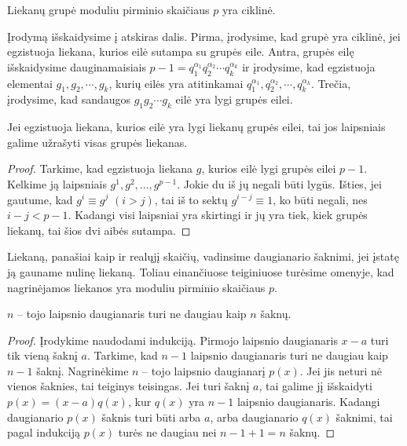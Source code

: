 \begin{thm} 
  Liekanų grupė moduliu pirminio skaičiaus $p$ yra ciklinė.
\end{thm}

Įrodymą išskaidysime į atskiras dalis. Pirma, įrodysime, kad grupė yra
ciklinė, jei egzistuoja liekana, kurios eilė sutampa su grupės eile. Antra,
grupės eilę išskaidysime dauginamaisiais $p-1 = q_1^{\alpha_1}
q_2^{\alpha_2} \cdots q_k^{\alpha_k}$ ir įrodysime, kad egzistuoja
elementai $g_1, g_2, \cdots, g_k$, kurių eilės yra atitinkamai
$q_1^{\alpha_1}, q_2^{\alpha_2}, \cdots, q_k^{\alpha_k}$. Trečia,
įrodysime, kad sandaugos $g_1g_2\cdots g_k$ eilė yra lygi grupės eilei. 

\begin{teig}
  Jei egzistuoja liekana, kurios eilė yra lygi liekanų grupės eilei, tai jos
  laipsniais galime užrašyti visas grupės liekanas.
\end{teig}

\begin{proof}
  Tarkime, kad egzistuoja liekana $g$, kurios eilė lygi grupės eilei
  $p-1$. Kelkime ją laipsniais $g^1, g^2, \dots, g^{p-1}$. Jokie du iš jų
  negali būti lygūs. Išties, jei gautume, kad $g^i \equiv g^j$ $(i>j)$, tai iš to
  sektų $g^{i-j}\equiv 1$, ko būti negali, nes $i-j<p-1$. Kadangi visi
  laipsniai yra skirtingi ir jų yra tiek, kiek grupės liekanų, tai šios dvi
  aibės sutampa.
\end{proof}

Liekaną, panašiai kaip ir realųjį skaičių, vadinsime daugianario šaknimi,
jei įstatę ją gauname nulinę liekaną. Toliau einančiuose teiginiuose
turėsime omenyje, kad nagrinėjamos liekanos yra moduliu pirminio skaičiaus
$p$. 

\begin{teig}
  $n$ -- tojo laipsnio daugianaris turi ne daugiau kaip $n$ šaknų.
\end{teig}

\begin{proof}
Įrodykime naudodami indukciją. Pirmojo laipsnio daugianaris $x-a$ turi tik
vieną šaknį $a$. Tarkime, kad $n-1$ laipsnio daugianaris turi ne daugiau
kaip $n-1$ šaknį. Nagrinėkime $n$ -- tojo laipsnio daugianarį $p(x)$. Jei
jis neturi nė vienos šaknies, tai teiginys teisingas. Jei turi šaknį $a$,
tai galime jį išskaidyti $p(x) = (x-a)q(x)$, kur $q(x)$ yra $n-1$ laipsnio
daugianaris. Kadangi daugianario $p(x)$ šaknis turi būti arba $a$, arba
daugianario $q(x)$ šaknimi, tai pagal indukciją $p(x)$ turės ne daugiau nei
$n - 1 + 1 = n$ šaknų.  
\end{proof}

